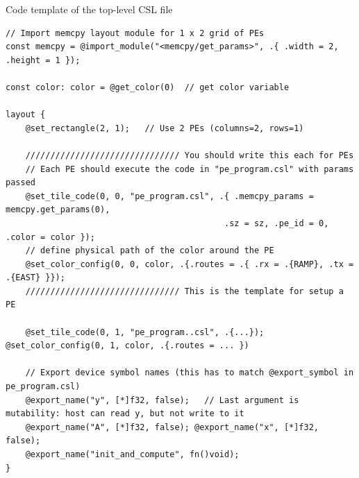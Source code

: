 \documentclass[dvipdfmx, 11pt, aspectratio=169]{beamer}   %
\begin{document}
\begin{frame}[fragile]{Code template of the top-level CSL file}
\begin{lstlisting}[language=CSL, basicstyle=\ttfamily\tiny]
// Import memcpy layout module for 1 x 2 grid of PEs
const memcpy = @import_module("<memcpy/get_params>", .{ .width = 2, .height = 1 });

const color: color = @get_color(0)  // get color variable

layout {
    @set_rectangle(2, 1);   // Use 2 PEs (columns=2, rows=1)

    /////////////////////////////// You should write this each for PEs
    // Each PE should execute the code in "pe_program.csl" with params passed
    @set_tile_code(0, 0, "pe_program.csl", .{ .memcpy_params = memcpy.get_params(0),
                                            .sz = sz, .pe_id = 0, .color = color });
    // define physical path of the color around the PE
    @set_color_config(0, 0, color, .{.routes = .{ .rx = .{RAMP}, .tx = .{EAST} }});
    /////////////////////////////// This is the template for setup a PE

    @set_tile_code(0, 1, "pe_program..csl", .{...}); @set_color_config(0, 1, color, .{.routes = ... })

    // Export device symbol names (this has to match @export_symbol in pe_program.csl)
    @export_name("y", [*]f32, false);   // Last argument is mutability: host can read y, but not write to it
    @export_name("A", [*]f32, false); @export_name("x", [*]f32, false); 
    @export_name("init_and_compute", fn()void);
}
\end{lstlisting}
\end{frame}
\end{document}

